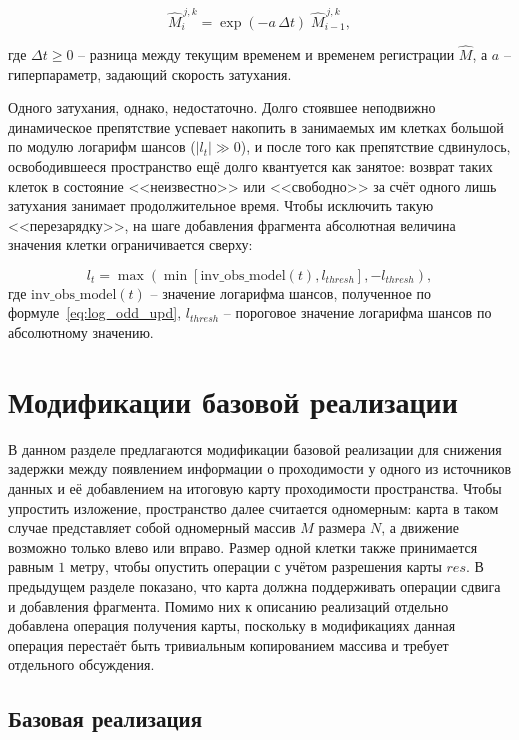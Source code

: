 \begin{equation}
	\widehat{M}_{i}^{\,j,k} = \exp(-a\,\Delta t)\;\widehat{M}_{i-1}^{\,j,k},
	\label{eq:dim}
\end{equation}

где $\Delta t \geq 0$ -- разница между текущим временем и временем регистрации $\widehat{M}$, а $a$ -- гиперпараметр, задающий скорость затухания.

Одного затухания, однако, недостаточно. Долго стоявшее неподвижно динамическое препятствие успевает накопить в занимаемых им клетках большой по модулю логарифм шансов ($|l_t| \gg 0$), и после того как препятствие сдвинулось, освободившееся пространство ещё долго квантуется как занятое: возврат таких клеток в состояние <<неизвестно>> или <<свободно>> за счёт одного лишь затухания занимает продолжительное время. Чтобы исключить такую <<перезарядку>>, на шаге добавления фрагмента абсолютная величина значения клетки ограничивается сверху:

\begin{equation}
	l_{t} = \max\left(\min\left[\text{inv\_obs\_model}(t), l_{thresh}\right], -l_{thresh}\right),
	\label{eq:l_clip}
\end{equation}
где $\text{inv\_obs\_model}(t)$ -- значение логарифма шансов, полученное по формуле~\cref{eq:log_odd_upd}, $l_{thresh}$ -- пороговое значение логарифма шансов по абсолютному значению.

\section{Модификации базовой реализации}\label{sec:implementations}

В данном разделе предлагаются модификации базовой реализации для снижения задержки между появлением информации о проходимости у одного из источников данных и её добавлением на итоговую карту проходимости пространства. Чтобы упростить изложение, пространство далее считается одномерным: карта в таком случае представляет собой одномерный массив $M$ размера $N$, а движение возможно только влево или вправо. Размер одной клетки также принимается равным $1$ метру, чтобы опустить операции с учётом разрешения карты $res$. В предыдущем разделе показано, что карта должна поддерживать операции сдвига и добавления фрагмента. Помимо них к описанию реализаций отдельно добавлена операция получения карты, поскольку в модификациях данная операция перестаёт быть тривиальным копированием массива и требует отдельного обсуждения.  

\subsection{Базовая реализация}

